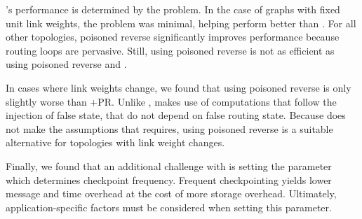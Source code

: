 \seconds's performance is determined by the \infinity problem. In the case of \er graphs with fixed unit link weights, the \infinity problem was minimal, 
helping \second perform better than \purges. %
For all other topologies, poisoned reverse significantly improves \second performance because routing loops are pervasive.
Still, \second using poisoned reverse is not as efficient as \cpr using poisoned reverse and \purges.

In cases where link weights change, we found that \purge using poisoned reverse is only slightly worse than \cprs+{\textsc PR}. %
Unlike \cprs, \purge makes use of computations that follow the injection of false state, that do not depend on false routing state.  
Because \purge does not make the assumptions that \cpr requires, \purge using poisoned reverse is a suitable alternative for topologies with link weight changes.



Finally, we found that an additional challenge with \cpr is setting the parameter which determines checkpoint frequency.
Frequent checkpointing yields lower message and time overhead at the cost of more storage overhead. Ultimately, application-specific factors must be considered
when setting this parameter. 
